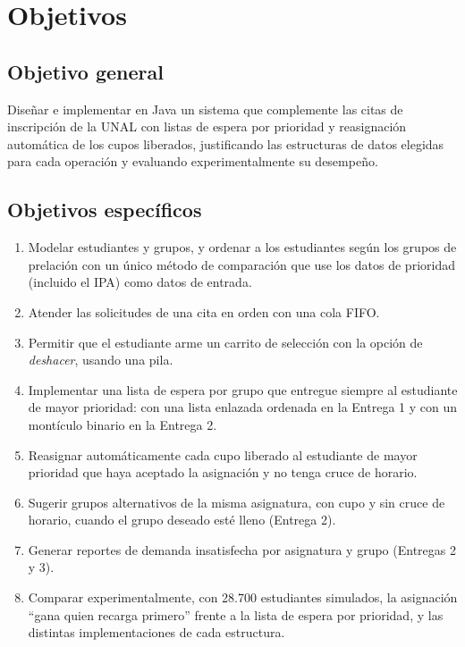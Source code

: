 \documentclass[conference]{IEEEtran}
\begin{document}

\section{Objetivos}

\subsection{Objetivo general}
Diseñar e implementar en Java un sistema que complemente las citas de inscripción de la UNAL con listas de espera por prioridad y reasignación automática de los cupos liberados, justificando las estructuras de datos elegidas para cada operación y evaluando experimentalmente su desempeño.

\subsection{Objetivos específicos}
\begin{enumerate}
    \item Modelar estudiantes y grupos, y ordenar a los estudiantes según los grupos de prelación con un único método de comparación que use los datos de prioridad (incluido el IPA) como datos de entrada.
    \item Atender las solicitudes de una cita en orden con una cola FIFO.
    \item Permitir que el estudiante arme un carrito de selección con la opción de \emph{deshacer}, usando una pila.
    \item Implementar una lista de espera por grupo que entregue siempre al estudiante de mayor prioridad: con una lista enlazada ordenada en la Entrega 1 y con un montículo binario en la Entrega 2.
    \item Reasignar automáticamente cada cupo liberado al estudiante de mayor prioridad que haya aceptado la asignación y no tenga cruce de horario.
    \item Sugerir grupos alternativos de la misma asignatura, con cupo y sin cruce de horario, cuando el grupo deseado esté lleno (Entrega 2).
    \item Generar reportes de demanda insatisfecha por asignatura y grupo (Entregas 2 y 3).
    \item Comparar experimentalmente, con 28.700 estudiantes simulados, la asignación ``gana quien recarga primero'' frente a la lista de espera por prioridad, y las distintas implementaciones de cada estructura.
\end{enumerate}
\end{document}
